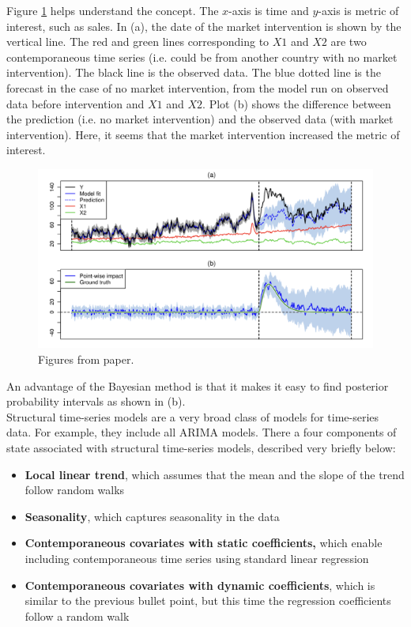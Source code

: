 \documentclass[12pt]{article}
\begin{document}
Figure \ref{fig:my_label} helps understand the concept. The $x$-axis is time and $y$-axis is metric of interest, such as sales. In (a), the date of the market intervention is shown by the vertical line. The red and green lines corresponding to $X1$ and $X2$ are two contemporaneous time series (i.e. could be from another country with no market intervention). The black line is the observed data. The blue dotted line is the forecast in the case of no market intervention, from the model run on observed data before intervention and $X1$ and $X2$. Plot (b) shows the difference between the prediction (i.e. no market intervention) and the observed data (with market intervention). Here, it seems that the market intervention increased the metric of interest.
    \begin{figure}[h!]
    \centering
    \includegraphics[scale=.4
    ]{figures/frompaper.png}
    \caption{Figures from paper.}
    \label{fig:my_label}
\end{figure}
An advantage of the Bayesian method is that it makes it easy to find posterior probability intervals as shown in (b).\\

Structural time-series models are a very broad class of models for time-series data. For example, they include all ARIMA models. There a four components of state associated with structural time-series models, described very briefly below:\\
\begin{itemize}
    \item \textbf{Local linear trend}, which assumes that  the mean and the slope of the trend follow random walks
    \item \textbf{Seasonality}, which captures seasonality in the data
    \item \textbf{Contemporaneous covariates with static coefficients,} which enable including contemporaneous time series using standard linear regression
    \item \textbf{Contemporaneous covariates with dynamic coefficients}, which is similar to the previous bullet point, but this time the regression coefficients follow a random walk\\
    \end{itemize}  
    
\end{document}
